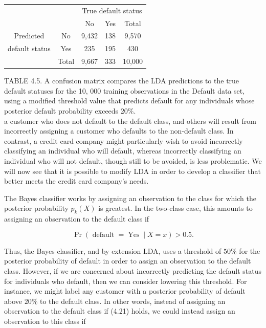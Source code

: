 \documentclass[10pt]{article}
\begin{document}
\begin{center}
\begin{tabular}{cc|cc|c}
\hline
 &  & \multicolumn{3}{|c}{True default status} \\
 &  & No & Yes & Total \\
\hline
Predicted & No & 9,432 & 138 & 9,570 \\
default status & Yes & 235 & 195 & 430 \\
\cline { 2 - 5 }
 & Total & 9,667 & 333 & 10,000 \\
\hline
\end{tabular}
\end{center}

TABLE 4.5. A confusion matrix compares the LDA predictions to the true default statuses for the 10, 000 training observations in the Default data set, using a modified threshold value that predicts default for any individuals whose posterior default probability exceeds $20 \%$.\\
a customer who does not default to the default class, and others will result from incorrectly assigning a customer who defaults to the non-default class. In contrast, a credit card company might particularly wish to avoid incorrectly classifying an individual who will default, whereas incorrectly classifying an individual who will not default, though still to be avoided, is less problematic. We will now see that it is possible to modify LDA in order to develop a classifier that better meets the credit card company's needs.

The Bayes classifier works by assigning an observation to the class for which the posterior probability $p_{k}(X)$ is greatest. In the two-class case, this amounts to assigning an observation to the default class if


\begin{equation*}
\operatorname{Pr}(\text { default }=\operatorname{Yes} \mid X=x)>0.5 . \tag{4.21}
\end{equation*}


Thus, the Bayes classifier, and by extension LDA, uses a threshold of $50 \%$ for the posterior probability of default in order to assign an observation to the default class. However, if we are concerned about incorrectly predicting the default status for individuals who default, then we can consider lowering this threshold. For instance, we might label any customer with a posterior probability of default above $20 \%$ to the default class. In other words, instead of assigning an observation to the default class if (4.21) holds, we could instead assign an observation to this class if
\end{document}
